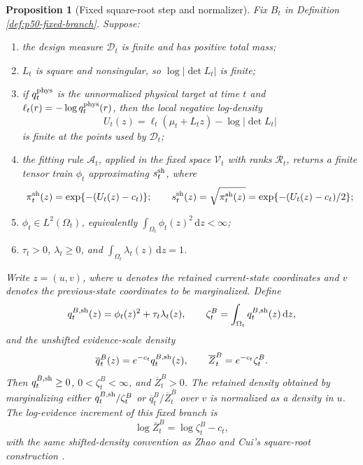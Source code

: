 \documentclass[11pt]{article}
\newtheorem{proposition}{Proposition}
\numberwithin{equation}{section}
\newcommand{\dd}{\,\mathrm d}
\begin{document}
\begin{proposition}[Fixed square-root step and normalizer]
\label{prop:p50-fixed-square-root-normalized}
Fix \(B_t\) in Definition \ref{def:p50-fixed-branch}.  Suppose:
\begin{enumerate}[label=(\roman*)]
\item the design measure \(\mathcal D_t\) is finite and has positive total
mass;
\item \(L_t\) is square and nonsingular, so \(\log|\det L_t|\) is finite;
\item if \(q_t^{\rm phys}\) is the unnormalized physical target at time \(t\)
and \(\ell_t(r)=-\log q_t^{\rm phys}(r)\), then the local negative log-density
\[
    U_t(z)=\ell_t(\mu_t+L_tz)-\log|\det L_t|
\]
is finite at the points used by \(\mathcal D_t\);
\item the fitting rule \(\mathcal A_t\), applied in the fixed space
\(\mathcal V_t\) with ranks \(\mathcal R_t\), returns a finite tensor train
\(\phi_t\) approximating \(s_t^{\rm sh}\), where
\[
\begin{gathered}
    \pi_t^{\rm sh}(z)=\exp\{-(U_t(z)-c_t)\};
    \qquad
    s_t^{\rm sh}(z)=\sqrt{\pi_t^{\rm sh}(z)}
    =\exp\{-(U_t(z)-c_t)/2\};
\end{gathered}
\]
\item \(\phi_t\in L^2(\Omega_t)\), equivalently
\(\int_{\Omega_t}\phi_t(z)^2\dd z<\infty\);
\item \(\tau_t>0\), \(\lambda_t\ge0\), and
\(\int_{\Omega_t}\lambda_t(z)\dd z=1\).
\end{enumerate}
Write \(z=(u,v)\), where \(u\) denotes the retained current-state coordinates
and \(v\) denotes the previous-state coordinates to be marginalized.
Define
\begin{equation}
    q_t^{B,{\rm sh}}(z)
    =
    \phi_t(z)^2+\tau_t\lambda_t(z),
    \qquad
    \zeta_t^B
    =
    \int_{\Omega_t}q_t^{B,{\rm sh}}(z)\dd z,
    \label{eq:p50-fixed-shifted-density}
\end{equation}
and the unshifted evidence-scale density
\begin{equation}
    \overline q_t^B(z)
    =
    e^{-c_t}q_t^{B,{\rm sh}}(z),
    \qquad
    \overline Z_t^B
    =
    e^{-c_t}\zeta_t^B.
    \label{eq:p50-fixed-original-density}
\end{equation}
Then \(q_t^{B,{\rm sh}}\ge0\), \(0<\zeta_t^B<\infty\), and
\(\overline Z_t^B>0\).  The retained density obtained by marginalizing either
\(q_t^{B,{\rm sh}}/\zeta_t^B\) or
\(\overline q_t^B/\overline Z_t^B\) over \(v\) is normalized as a density in
\(u\).
The log-evidence increment of this fixed branch is
\[
    \log\overline Z_t^B=\log\zeta_t^B-c_t,
\]
with the same shifted-density convention as Zhao and Cui's square-root
construction \cite[Algorithm~2 and Eq.~(13)]{zhao2024ttsequential}.
\end{proposition}
\end{document}
